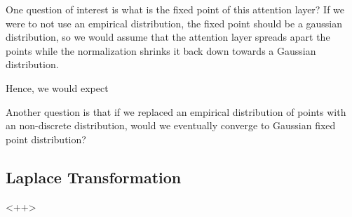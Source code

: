 \documentclass[a4paper]{article}
\begin{document}
One question of interest is what is the fixed point of this attention layer?  If we were to not use an empirical distribution, the fixed point should be a gaussian distribution, so we would assume that the attention layer spreads apart the points while the normalization shrinks it back down towards a Gaussian distribution.

Hence, we would expect 

Another question is that if we replaced an empirical distribution of points with an non-discrete distribution, would we eventually converge to Gaussian fixed point distribution?

\subsection{Laplace Transformation}<++>
\end{document}

